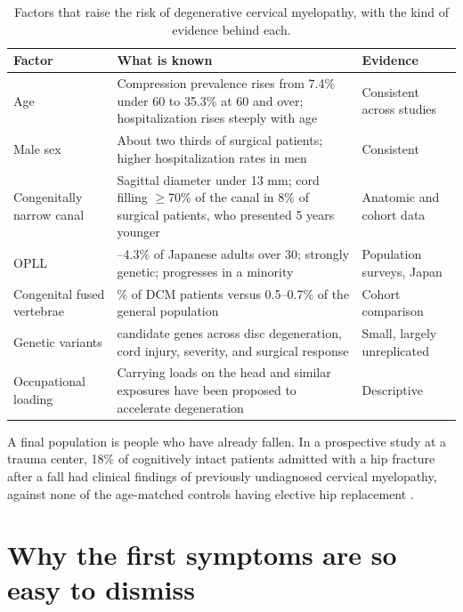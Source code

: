 \documentclass[11pt, letterpaper]{article}
\begin{document}
\begin{table}[!htb]
\centering\small
\begin{tabular}{@{}>{\raggedright\arraybackslash}p{3.61cm}>{\raggedright\arraybackslash}p{6.24cm}>{\raggedright\arraybackslash}p{3.75cm}@{}}
\toprule
Factor & What is known & Evidence \\
\midrule
Age & Compression prevalence rises from 7.4\% under 60 to 35.3\% at 60 and over; hospitalization rises steeply with age \citep{smith2021,wu2013} & Consistent across studies \\
Male sex & About two thirds of surgical patients; higher hospitalization rates in men \citep{fehlings2015,wu2013} & Consistent \\
Congenitally narrow canal & Sagittal diameter under 13 mm; cord filling \ensuremath{\geq}70\% of the canal in 8\% of surgical patients, who presented 5 years younger \citep{bajwa2012,nouri2022} & Anatomic and cohort data \\
OPLL & 1.9–4.3\% of Japanese adults over 30; strongly genetic; progresses in a minority \citep{matsunaga2012} & Population surveys, Japan \\
Congenital fused vertebrae & 2.4\% of DCM patients versus 0.5–0.7\% of the general population \citep{nouri2022} & Cohort comparison \\
Genetic variants & 28 candidate genes across disc degeneration, cord injury, severity, and surgical response \citep{pope2020genetics} & Small, largely unreplicated \\
Occupational loading & Carrying loads on the head and similar exposures have been proposed to accelerate degeneration \citep{nouri2015} & Descriptive \\
\bottomrule
\end{tabular}
\caption{Factors that raise the risk of degenerative cervical myelopathy, with the kind of evidence behind each.}
\end{table}

A final population is people who have already fallen. In a prospective study at a trauma center, 18\% of cognitively intact patients admitted with a hip fracture after a fall had clinical findings of previously undiagnosed cervical myelopathy, against none of the age-matched controls having elective hip replacement \citep{radcliff2016}.

\section{Why the first symptoms are so easy to dismiss}
\end{document}
